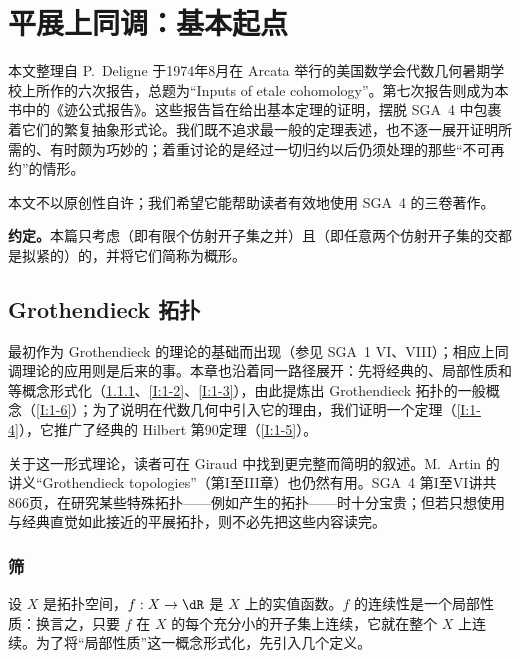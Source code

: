 \chapter{平展上同调：基本起点}\label{I}
本文整理自 P.\ Deligne 于1974年8月在 Arcata 举行的美国数学会代数几何暑期学校上所作的六次报告，总题为“Inputs of etale cohomology”。第七次报告则成为本书中的《迹公式报告》。这些报告旨在给出基本定理的证明，摆脱 SGA~4 中包裹着它们的繁复抽象形式论。我们既不追求最一般的定理表述，也不逐一展开证明所需的、有时颇为巧妙的；着重讨论的是经过一切归约以后仍须处理的那些“不可再约”的情形。

本文不以原创性自许；我们希望它能帮助读者有效地使用 SGA~4 的三卷著作。

\noindent\textbf{约定。}本篇只考虑（即有限个仿射开子集之并）且（即任意两个仿射开子集的交都是拟紧的）的，并将它们简称为概形。

\section{Grothendieck 拓扑}\label{I:1}
最初作为 Grothendieck 的理论的基础而出现（参见 SGA~1 VI、VIII）；相应上同调理论的应用则是后来的事。本章也沿着同一路径展开：先将经典的、局部性质和等概念形式化（\ref{I:1-1}、\ref{I:1-2}、\ref{I:1-3}），由此提炼出 Grothendieck 拓扑的一般概念（\ref{I:1-6}）；为了说明在代数几何中引入它的理由，我们证明一个定理（\ref{I:1-4}），它推广了经典的 Hilbert 第90定理（\ref{I:1-5}）。

关于这一形式理论，读者可在 Giraud \cite{gi64} 中找到更完整而简明的叙述。M.\ Artin 的讲义“Grothendieck topologies”\cite{ar62}（第I至III章）也仍然有用。SGA~4 第I至VI讲共866页，在研究某些特殊拓扑——例如产生的拓扑——时十分宝贵；但若只想使用与经典直觉如此接近的平展拓扑，则不必先把这些内容读完。

\subsection{筛}\label{I:1-1}
设 $X$ 是拓扑空间，$f:X\to\dR$ 是 $X$ 上的实值函数。$f$ 的连续性是一个局部性质：换言之，只要 $f$ 在 $X$ 的每个充分小的开子集上连续，它就在整个 $X$ 上连续。为了将“局部性质”这一概念形式化，先引入几个定义。

